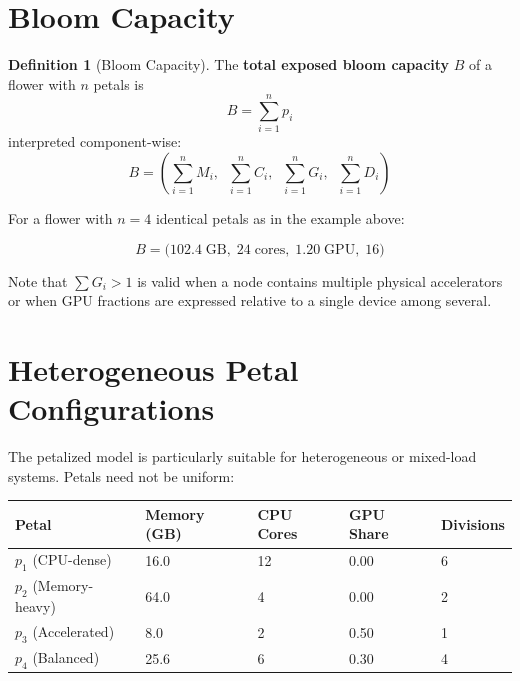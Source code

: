 \documentclass[11pt, a4paper, oneside]{article}
\theoremstyle{definition}
\newtheorem{definition}{Definition}[section]
\begin{document}
\section{Bloom Capacity}

\begin{definition}[Bloom Capacity]
The \textbf{total exposed bloom capacity} $B$ of a flower with $n$ petals is
\begin{equation}
  B = \sum_{i=1}^{n} p_i
\end{equation}
interpreted component-wise:
\begin{equation}
  B = \left(
    \sum_{i=1}^{n} M_i,\;\;
    \sum_{i=1}^{n} C_i,\;\;
    \sum_{i=1}^{n} G_i,\;\;
    \sum_{i=1}^{n} D_i
  \right)
\end{equation}
\end{definition}

For a flower with $n = 4$ identical petals as in the example above:

\begin{equation}
  B = \bigl( 102.4\;\text{GB},\; 24\;\text{cores},\; 1.20\;\text{GPU},\; 16 \bigr)
\end{equation}

Note that $\sum G_i > 1$ is valid when a node contains multiple physical
accelerators or when GPU fractions are expressed relative to a single device
among several.

\section{Heterogeneous Petal Configurations}

The petalized model is particularly suitable for heterogeneous or mixed-load
systems.  Petals need not be uniform:

\begin{center}
\begin{tabular}{@{} l C{2.2cm} C{1.8cm} C{1.8cm} C{1.4cm} @{}}
\toprule
\textbf{Petal} & \textbf{Memory (GB)} & \textbf{CPU Cores} & \textbf{GPU Share} & \textbf{Divisions} \\
\midrule
$p_1$ (CPU-dense)     & 16.0  & 12 & 0.00 & 6 \\
$p_2$ (Memory-heavy)  & 64.0  & 4  & 0.00 & 2 \\
$p_3$ (Accelerated)   & 8.0   & 2  & 0.50 & 1 \\
$p_4$ (Balanced)      & 25.6  & 6  & 0.30 & 4 \\
\bottomrule
\end{tabular}
\end{center}
\end{document}
